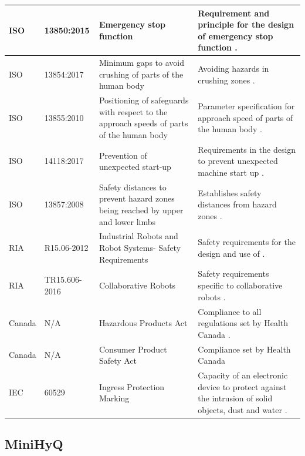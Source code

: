 \begin{center}
\begin{longtable}{ | p{2.2cm} | p{2.5cm} | p{4cm} |p{6cm}|}
        \\ \hline
        ISO & 13850:2015 & Emergency stop function & Requirement and principle for the design of emergency stop function \cite{iso_iso_nodate-4}.
        \\ \hline
        ISO & 13854:2017 & Minimum gaps to avoid crushing of parts of the human body & Avoiding hazards in crushing zones \cite{iso_iso_nodate-8}.
        \\ \hline
        ISO & 13855:2010 & Positioning of safeguards with respect to the approach speeds of parts of the human body & Parameter specification for approach speed of parts of the human body \cite{iso_iso_nodate-5}.
        \\ \hline
        ISO & 14118:2017 & Prevention of unexpected start-up & Requirements in the design to prevent unexpected machine start up \cite{iso_iso_nodate-6}.
        \\ \hline
        ISO & 13857:2008 & Safety distances to prevent hazard zones being reached by upper and lower limbs & Establishes safety distances from hazard zones \cite{iso_iso_nodate-7}.
        \\ \hline
        RIA & R15.06-2012 &  Industrial Robots and Robot Systems- Safety Requirements & Safety requirements for the design and use of \cite{ansi_ansi/ria_nodate}.
        \\ \hline
        RIA & TR15.606-2016 & Collaborative Robots & Safety requirements specific to collaborative robots \cite{ria_ria_nodate}.
        \\ \hline
        Canada & N/A & Hazardous Products Act & Compliance to all regulations set by Health Canada \cite{canada_hazardous_2019}.
        \\ \hline
        Canada & N/A & Consumer Product Safety Act & Compliance set by Health Canada \cite{canada_canada_2011}
         \\ \hline
        IEC & 60529 & Ingress Protection Marking & Capacity of an electronic device to protect against the intrusion of solid objects, dust and water \cite{dstm_ip_nodate}.
        \\ \hline
       
    \end{longtable}
\end{center}


\subsection{MiniHyQ} \label{app:minihyq}


